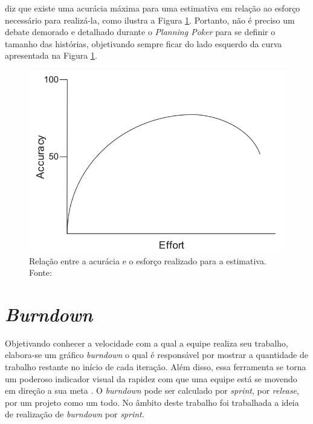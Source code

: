      diz que existe uma acurácia máxima para uma estimativa
    em relação ao esforço necessário para realizá-la, como ilustra a Figura \ref{fig:effort_accuracy}.
    Portanto, não é preciso um debate demorado e detalhado durante o \textit{Planning Poker} para se definir
    o tamanho das histórias, objetivando sempre ficar do lado esquerdo da curva apresentada na Figura \ref{fig:effort_accuracy}.



    \begin{figure}[!htb]
      \centering
      \includegraphics[scale=0.4]{figuras/effort_accuracy}
      \caption[Relação entre a acurácia e o esforço realizado para a estimativa.]
	      {Relação entre a acurácia e o esforço realizado para a estimativa. Fonte: \cite{cohn06}}
      \label{fig:effort_accuracy}
    \end{figure}

  \section{\textit{Burndown}}

    Objetivando conhecer a velocidade com a qual a equipe realiza seu trabalho, elabora-se um gráfico \textit{burndown} o qual é responsável por mostrar a quantidade de trabalho restante no início de cada iteração. Além disso, essa ferramenta se torna um poderoso indicador visual da rapidez com que uma equipe está se movendo em direção a sua meta \cite{cohn06}. O \textit{burndown} pode ser calculado por \textit{sprint}, por \textit{release}, por um projeto como um todo. No âmbito deste trabalho foi trabalhada a ideia de realização de \textit{burndown} por \textit{sprint}.

